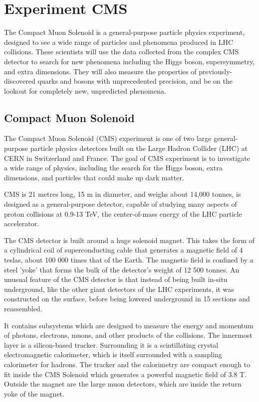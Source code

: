 \section{Experiment CMS}
The Compact Muon Solenoid is a general-purpose particle physics experiment, designed to see a wide range of particles and phenomena produced in LHC collisions. These scientists will use the data collected from the complex CMS detector to search for new phenomena including the Higgs boson, supersymmetry, and extra dimensions. They will also measure the properties of previously-discovered quarks and bosons with unprecedented precision, and be on the lookout for completely new, unpredicted phenomena.

\subsection{Compact Muon Solenoid}

The Compact Muon Solenoid (CMS) experiment is one of two large general-purpose particle physics detectors built on the Large Hadron Collider (LHC) at CERN in Switzerland and France. The goal of CMS experiment is to investigate a wide range of physics, including the search for the Higgs boson, extra dimensions, and particles that could make up dark matter.

CMS is 21 metres long, 15 m in diameter, and weighs about 14,000 tonnes, is designed as a general-purpose detector, capable of studying many aspects of proton collisions at 0.9-13 TeV, the center-of-mass energy of the LHC particle accelerator.

The CMS detector is built around a huge solenoid magnet. This takes the form of a cylindrical coil of superconducting cable that generates a magnetic field of 4 teslas, about 100 000 times that of the Earth. The magnetic field is confined by a steel 'yoke' that forms the bulk of the detector's weight of 12 500 tonnes. An unusual feature of the CMS detector is that instead of being built in-situ underground, like the other giant detectors of the LHC experiments, it was constructed on the surface, before being lowered underground in 15 sections and reassembled.

It contains subsystems which are designed to measure the energy and momentum of photons, electrons, muons, and other products of the collisions. The innermost layer is a silicon-based tracker. Surrounding it is a scintillating crystal electromagnetic calorimeter, which is itself surrounded with a sampling calorimeter for hadrons. The tracker and the calorimetry are compact enough to fit inside the CMS Solenoid which generates a powerful magnetic field of 3.8 T. Outside the magnet are the large muon detectors, which are inside the return yoke of the magnet.

